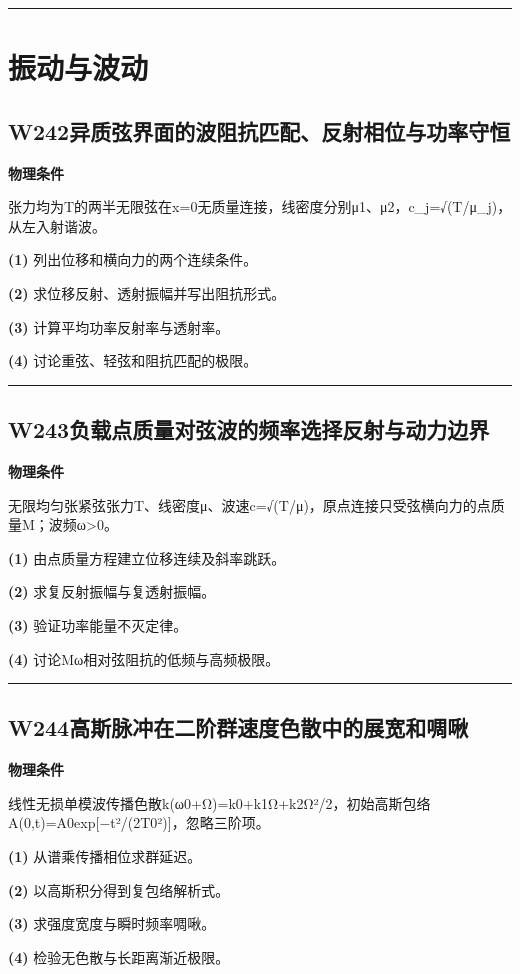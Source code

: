 \documentclass[UTF8,a4paper,11pt,oneside,openany]{ctexbook}
\begin{document}
\par\bigskip\hrule\bigskip
\chapter{振动与波动}
\section*{W242\quad 异质弦界面的波阻抗匹配、反射相位与功率守恒}
\textbf{物理条件}\par 张力均为T的两半无限弦在x=0无质量连接，线密度分别μ1、μ2，c\_j=√(T/μ\_j)，从左入射谐波。
\par\noindent\textbf{(1)} 列出位移和横向力的两个连续条件。
\par\noindent\textbf{(2)} 求位移反射、透射振幅并写出阻抗形式。
\par\noindent\textbf{(3)} 计算平均功率反射率与透射率。
\par\noindent\textbf{(4)} 讨论重弦、轻弦和阻抗匹配的极限。

\par\bigskip\hrule\bigskip
\section*{W243\quad 负载点质量对弦波的频率选择反射与动力边界}
\textbf{物理条件}\par 无限均匀张紧弦张力T、线密度μ、波速c=√(T/μ)，原点连接只受弦横向力的点质量M；波频ω>0。
\par\noindent\textbf{(1)} 由点质量方程建立位移连续及斜率跳跃。
\par\noindent\textbf{(2)} 求复反射振幅与复透射振幅。
\par\noindent\textbf{(3)} 验证功率能量不灭定律。
\par\noindent\textbf{(4)} 讨论Mω相对弦阻抗的低频与高频极限。

\par\bigskip\hrule\bigskip
\section*{W244\quad 高斯脉冲在二阶群速度色散中的展宽和啁啾}
\textbf{物理条件}\par 线性无损单模波传播色散k(ω0+Ω)=k0+k1Ω+k2Ω²/2，初始高斯包络A(0,t)=A0exp[−t²/(2T0²)]，忽略三阶项。
\par\noindent\textbf{(1)} 从谱乘传播相位求群延迟。
\par\noindent\textbf{(2)} 以高斯积分得到复包络解析式。
\par\noindent\textbf{(3)} 求强度宽度与瞬时频率啁啾。
\par\noindent\textbf{(4)} 检验无色散与长距离渐近极限。
\end{document}
